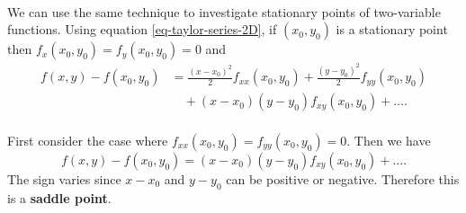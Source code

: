 \documentclass[../multivariate_calculus.tex]{subfiles}
\begin{document}
        \paragraph{}
        We can use the same technique to investigate stationary points of two-variable functions.
        Using equation \ref{eq-taylor-series-2D}, if $(x_0,y_0)$ is a stationary point then $f_x(x_0,y_0)=f_y(x_0,y_0)=0$ and
        \begin{align}
            f(x,y)-f(x_0,y_0)&=\frac{(x-x_0)^2}{2}f_{xx}(x_0,y_0)+\frac{(y-y_0)^2}{2}f_{yy}(x_0,y_0)\\
            &\quad+(x-x_0)(y-y_0)f_{xy}(x_0,y_0)+\dots.
        \end{align}

        \paragraph{}
        First consider the case where $f_{xx}(x_0,y_0)=f_{yy}(x_0,y_0)=0$.
        Then we have
        \begin{equation}
            f(x,y)-f(x_0,y_0)=(x-x_0)(y-y_0)f_{xy}(x_0,y_0)+\dots.
        \end{equation}
        The sign varies since $x-x_0$ and $y-y_0$ can be positive or negative.
        Therefore this is a \textbf{saddle point}.
\end{document}
